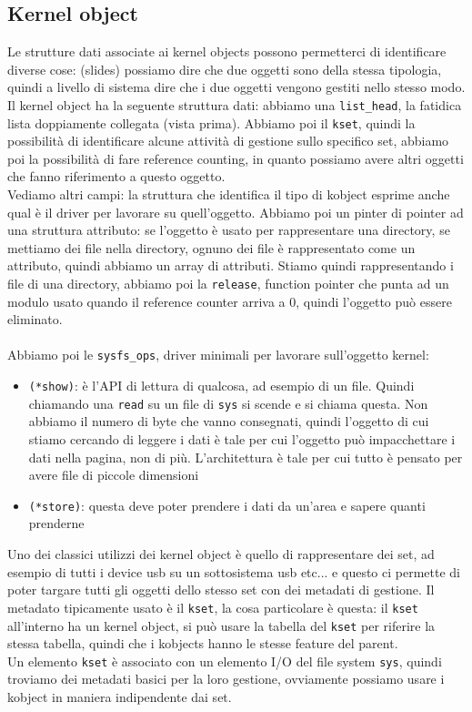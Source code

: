 \documentclass[12pt, oneside]{extbook}
\begin{document}
\subsection{Kernel object}
Le strutture dati associate ai kernel objects possono permetterci di identificare diverse cose:
(slides)
possiamo dire che due oggetti sono della stessa tipologia, quindi a livello di sistema dire che i due oggetti vengono gestiti nello stesso modo.\\Il kernel object ha la seguente struttura dati:
abbiamo una \texttt{list\_head}, la fatidica lista doppiamente collegata (vista prima). Abbiamo poi il \texttt{kset}, quindi la possibilità di identificare alcune attività di gestione sullo specifico set, abbiamo poi la possibilità di fare reference counting, in quanto possiamo avere altri oggetti che fanno riferimento a questo oggetto.\\Vediamo altri campi:
la struttura che identifica il tipo di kobject esprime anche qual è il driver per lavorare su quell'oggetto. Abbiamo poi un pinter di pointer ad una struttura attributo: se l'oggetto è usato per rappresentare una directory, se mettiamo dei file nella directory, ognuno dei file è rappresentato come un attributo, quindi abbiamo un array di attributi. Stiamo quindi rappresentando i file di una directory, abbiamo poi la \texttt{release}, function pointer che punta ad un modulo usato quando il reference counter arriva a 0, quindi l'oggetto può essere eliminato.\\\\Abbiamo poi le \texttt{sysfs\_ops}, driver minimali per lavorare sull'oggetto kernel:
\begin{itemize}
	\item \texttt{(*show)}: è l'API di lettura di qualcosa, ad esempio di un file. Quindi chiamando una \texttt{read} su un file di \texttt{sys} si scende e si chiama questa. Non abbiamo il numero di byte che vanno consegnati, quindi l'oggetto di cui stiamo cercando di leggere i dati è tale per cui l'oggetto può impacchettare i dati nella pagina, non di più. L'architettura è tale per cui tutto è pensato per avere file di piccole dimensioni
	\item \texttt{(*store)}: questa deve poter prendere i dati da un'area e sapere quanti prenderne
\end{itemize}
Uno dei classici utilizzi dei kernel object è quello di rappresentare dei set, ad esempio di tutti i device usb su un sottosistema usb etc... e questo ci permette di poter targare tutti gli oggetti dello stesso set con dei metadati di gestione. Il metadato tipicamente usato è il \texttt{kset}, la cosa particolare è questa:
il \texttt{kset} all'interno ha un kernel object, si può usare la tabella del \texttt{kset} per riferire la stessa tabella, quindi che i kobjects hanno le stesse feature del parent.\\Un elemento \texttt{kset} è associato con un elemento I/O del file system \texttt{sys}, quindi troviamo dei metadati basici per la loro gestione, ovviamente possiamo usare i kobject in maniera indipendente dai set.
\end{document}
